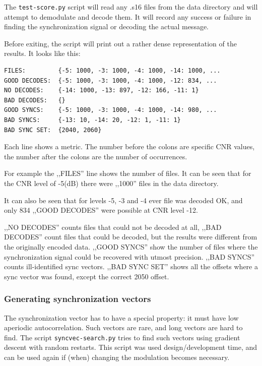 \documentclass[a4paper]{article}
\begin{document}
The \texttt{test-score.py} script will read any .s16 files from the 
data directory and will attempt to demodulate and decode them. It will 
record any success or failure in finding the synchronization signal or 
decoding the actual message.

Before exiting, the script will print out a rather dense representation 
of the results. It looks like this:

\begin{lstlisting}
FILES:         {-5: 1000, -3: 1000, -4: 1000, -14: 1000, ...
GOOD DECODES:  {-5: 1000, -3: 1000, -4: 1000, -12: 834, ...
NO DECODES:    {-14: 1000, -13: 897, -12: 166, -11: 1}
BAD DECODES:   {}
GOOD SYNCS:    {-5: 1000, -3: 1000, -4: 1000, -14: 980, ...
BAD SYNCS:     {-13: 10, -14: 20, -12: 1, -11: 1}
BAD SYNC SET:  {2040, 2060}
\end{lstlisting}

Each line shows a metric. The number before the colons are specific CNR 
values, the number after the colons are the number of occurrences.

For example the ,,FILES'' line shows the number of files. It can be 
seen that for the CNR level of -5(dB) there were ,,1000'' files in the 
data directory.

It can also be seen that for levels -5, -3 and -4 ever file was decoded 
OK, and only 834 ,,GOOD DECODES'' were possible at CNR level -12.

,,NO DECODES'' counts files that could not be decoded at all, ,,BAD 
DECODES'' count files that could be decoded, but the results were 
different from the originally encoded data. ,,GOOD SYNCS'' show the 
number of files where the synchronization signal could be recovered 
with utmost precision. ,,BAD SYNCS'' counts ill-identified sync 
vectors. ,,BAD SYNC SET'' shows all the offsets where a sync vector was 
found, except the correct 2050 offset.

\subsubsection{Generating synchronization vectors}

The synchronization vector has to have a special property: it must have 
low aperiodic autocorrelation. Such vectors are rare, and long vectors 
are hard to find. The script \texttt{syncvec-search.py} tries to find 
such vectors using gradient descent with random restarts. This script 
was used design/development time, and can be used again if (when) 
changing the modulation becomes necessary.
\end{document}

